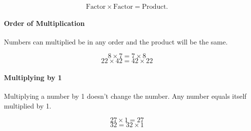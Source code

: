 \documentclass[12pt]{article}
\begin{document}
$$\text{Factor}\times \text{Factor} = \text{Product.}$$

\paragraph{Order of Multiplication}
Numbers can multiplied be in any order and the product will be the same.

$$8 \times 7 = 7\times 8$$
$$22 \times 42 = 42 \times 22$$

\paragraph{Multiplying by 1}
Multiplying a number by 1 doesn't change the number. Any number equals itself multiplied by 1.

$$27 \times 1= 27$$
$$32 = 32 \times 1$$

\newpage
\end{document}
